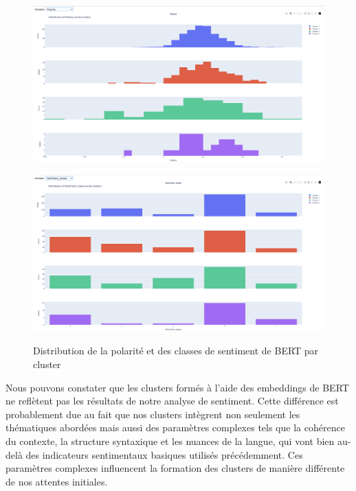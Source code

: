 \documentclass{article}
\begin{document}
\begin{figure}[h]
    \centering
    \begin{minipage}{.5\textwidth}
        \centering
        \includegraphics[width=0.9\linewidth]{polarity.png}
        \label{fig:Distribution de la polarité par cluster}
    \end{minipage}%
    \begin{minipage}{.5\textwidth}
        \centering
        \includegraphics[width=0.9\linewidth]{sentiment_bert.png}
        \label{fig:Distribution des classes de sentiment de BERT par cluster}
    \end{minipage}
    \caption{Distribution de la polarité et des classes de sentiment de BERT par cluster}
\end{figure}
\vspace{3cm}

Nous pouvons constater que les clusters formés à l'aide des embeddings de BERT ne reflètent pas les résultats de notre analyse de sentiment. Cette différence est probablement due au fait que nos clusters intègrent non seulement les thématiques abordées mais aussi des paramètres complexes tels que la cohérence du contexte, la structure syntaxique et les nuances de la langue, qui vont bien au-delà des indicateurs sentimentaux basiques utilisés précédemment. Ces paramètres complexes influencent la formation des clusters de manière différente de nos attentes initiales.

\end{document}
